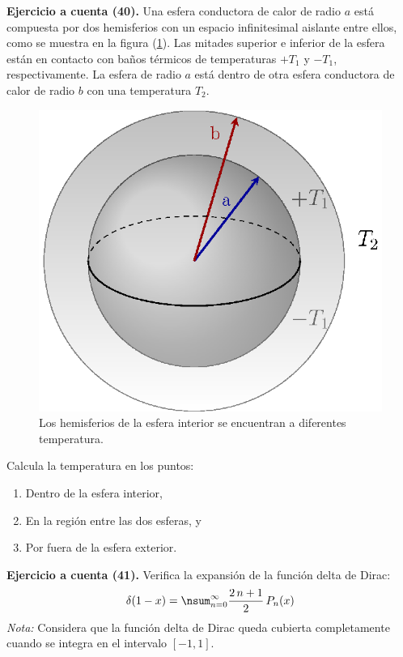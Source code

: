 \textbf{Ejercicio a cuenta (40). } Una esfera conductora de calor de radio $a$ está compuesta por dos hemisferios con un espacio infinitesimal aislante entre ellos, como se muestra en la figura (\ref{fig:figura2}). Las mitades superior e inferior de la esfera están en contacto con baños térmicos de temperaturas $+ T_{1}$ y $-T_{1}$, respectivamente. La esfera de radio $a$ está dentro de otra esfera conductora de calor de radio $b$ con una temperatura $T_{2}$.
\begin{figure}[H]
    \centering
   \includegraphics[scale=0.8]{Imagenes/esfera1.eps}
    \caption{Los hemisferios de la esfera interior se encuentran a diferentes temperatura.}
    \label{fig:figura2}
\end{figure}

Calcula la temperatura en los puntos:
\begin{enumerate}
\item Dentro de la esfera interior,
\item En la región entre las dos esferas, y
\item Por fuera de la esfera exterior.
\end{enumerate}

\noindent
\textbf{Ejercicio a cuenta (41). } Verifica la expansión de la función delta de Dirac:
\begin{align*}
\delta (1 - x) = \nsum_{n=0}^{\infty} \dfrac{2 \,n + 1}{2} \, P_{n} (x)
\end{align*}
\emph{Nota:} Considera que la función delta de Dirac queda cubierta completamente cuando se integra en el intervalo $[-1, 1]$.
